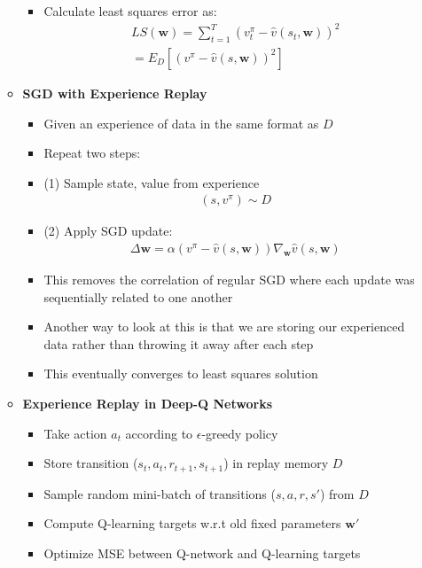 \documentclass[12pt]{article}
\begin{document}
\begin{itemize}
\begin{itemize}
\begin{itemize}
        \item Calculate least squares error as:
        \begin{gather*}
          LS(\textbf{w}) = \sum_{t=1}^T(v_t^\pi - \hat{v}(s_t, \textbf{w}))^2 \\
          = E_D[(v^\pi - \hat{v}(s, \textbf{w}))^2]
        \end{gather*}
      \end{itemize}
      \item \textbf{SGD with Experience Replay}
      \begin{itemize}
        \item Given an experience of data in the same format as $D$
        \item Repeat two steps:
        \item (1) Sample state, value from experience
        \begin{gather*} 
          (s, v^\pi) \sim D
        \end{gather*}
        \item (2) Apply SGD update:
        \begin{gather*}
          \Delta \textbf{w} = \alpha (v^\pi - \hat{v}(s, \textbf{w}))\nabla_{\textbf{w}}\hat{v}(s, \textbf{w})
        \end{gather*}
        \item This removes the correlation of regular SGD where each update was sequentially related to one another
        \item Another way to look at this is that we are storing our experienced data rather than throwing it away after each step
        \item This eventually converges to least squares solution
      \end{itemize}
      \item \textbf{Experience Replay in Deep-Q Networks}
      \begin{itemize}
        \item Take action $a_t$ according to $\epsilon$-greedy policy
        \item Store transition ($s_t, a_t, r_{t+1}, s_{t+1}$) in replay memory $D$
        \item Sample random mini-batch of transitions ($s, a, r, s'$) from $D$
        \item Compute Q-learning targets w.r.t old fixed parameters $\textbf{w}'$
        \item Optimize MSE between Q-network and Q-learning targets
        \begin{gather*}

\end{gather*}
\end{itemize}
\end{itemize}
\end{itemize}
\end{document}
